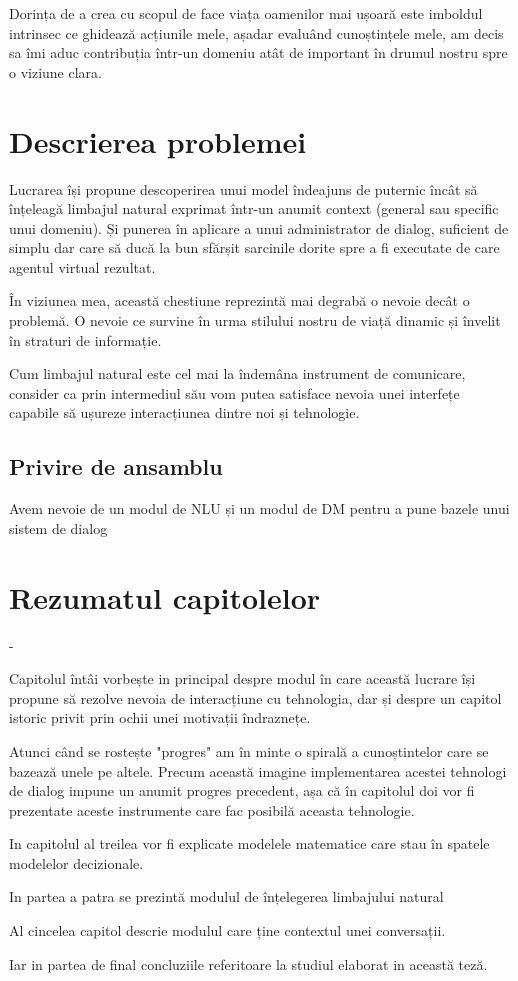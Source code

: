 Dorința de a crea cu scopul de face viața oamenilor mai ușoară este imboldul intrinsec ce ghidează acțiunile mele, așadar evaluând cunoștințele mele, am decis sa îmi aduc contribuția într-un domeniu atât de important în drumul nostru spre o viziune clara.

\section{Descrierea problemei}

Lucrarea își propune descoperirea unui model îndeajuns de puternic încât să înțeleagă limbajul natural exprimat într-un anumit context (general sau specific unui domeniu). Și punerea în aplicare a unui administrator de dialog, suficient de simplu dar care să ducă la bun sfărșit sarcinile dorite spre a fi executate de care agentul virtual rezultat.

În viziunea mea, această chestiune reprezintă mai degrabă o nevoie decât o problemă. O nevoie ce survine în urma stilului nostru de viață dinamic și învelit în straturi de informație.

Cum limbajul natural este cel mai la îndemâna instrument de comunicare, consider ca prin intermediul său vom putea satisface nevoia unei interfețe capabile să ușureze interacțiunea dintre noi și tehnologie.

\subsection{Privire de ansamblu}

Avem nevoie de un modul de NLU și un modul de DM pentru a pune bazele unui sistem de dialog

\section{Rezumatul capitolelor}

\begin{description}
	\item[Introducere]  - 
	
	Capitolul întâi vorbește in principal despre modul în care această lucrare își propune să rezolve nevoia de interacțiune cu tehnologia, dar și despre un capitol istoric privit prin ochii unei motivații îndraznețe.
	\item
	Atunci când se rostește "progres" am în minte o  spirală a cunoștintelor care se bazează unele pe altele. Precum această imagine implementarea acestei tehnologi de dialog impune un anumit progres precedent, așa că în capitolul doi vor fi prezentate aceste instrumente care fac posibilă aceasta tehnologie.
	\item
	In capitolul al treilea vor fi explicate modelele matematice care stau în spatele modelelor decizionale.
	\item
	In partea a patra se prezintă modulul de înțelegerea limbajului natural
	\item
	Al cincelea capitol descrie modulul care ține contextul unei conversații.
	\item
	Iar in partea de final concluziile referitoare la studiul elaborat in această teză.
\end{description}

